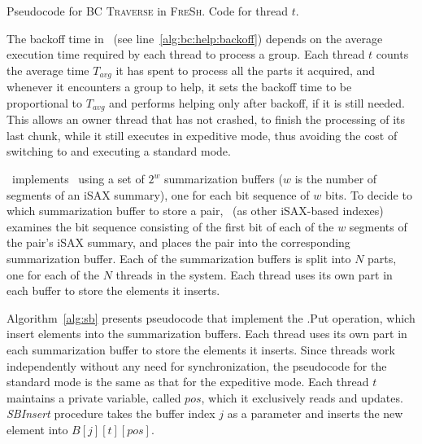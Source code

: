 \begin{algorithm}[t]
\begin{algorithmic}[1]
    \end{algorithmic}

    \caption{Pseudocode for BC \textsc{Traverse} in \textsc{FreSh}. Code for thread $t$.}
    \label{alg:bc}
\end{algorithm}

The backoff time in \Fresh\ (see line~\ref{alg:bc:help:backoff}) depends on the average
execution time required by each
thread to process a group. Each thread $\mathit{t}$ counts the average time 
$T_{avg}$ it has spent to process all the parts it acquired, and whenever
it encounters a group to help, it sets the backoff time to be proportional
to $T_{avg}$ and performs helping only after backoff, if it is still needed.
This allows an owner thread that has not crashed, to finish the processing of its last chunk,
while it still executes in expeditive mode, thus avoiding the cost of switching
to and executing a standard mode.
 
\Fresh\ implements \TP\ using a set of $2^w$ summarization buffers
($w$ is the number of segments of an iSAX summary), one for each bit sequence of $w$ bits.
To decide to which summarization buffer to store a pair,
\Fresh\ (as other iSAX-based indexes) 
examines the bit sequence consisting of the first bit of each 
of the $w$ segments of the pair's iSAX summary, 
and places the pair into the corresponding summarization buffer. 
Each of the summarization buffers is split into $N$ parts, one for each of the $N$ 
threads in the system. Each thread uses its own part in each buffer to store the
elements it inserts. 

Algorithm~\ref{alg:sb} presents pseudocode that implement the \TP.Put operation,
which insert elements into the summarization buffers. Each thread uses
its own part in each summarization buffer to store the elements it inserts.
Since threads work independently without any need for synchronization,  
the pseudocode for the standard mode is the same as that for the expeditive mode. 
Each thread $t$ maintains a private variable, called $\mathit{pos}$, which it
exclusively reads and updates.
\textit{SBInsert} procedure takes the buffer index $j$ as a parameter and
inserts the new element into $\mathit{B[j][t][pos]}$. 

